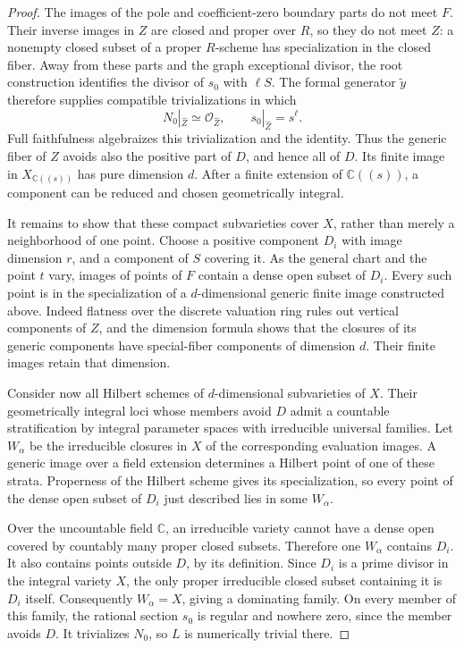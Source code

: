 \documentclass[11pt,letterpaper]{article}
\theoremstyle{definition}
\theoremstyle{remark}
\begin{document}
\begin{proof}
The images of the pole and coefficient-zero boundary
parts do not meet $F$.  Their inverse images in $Z$ are
closed and proper over $R$, so they do not meet $Z$:
a nonempty closed subset of a proper $R$-scheme has
specialization in the closed fiber.  Away from these parts
and the graph exceptional divisor, the root construction
identifies the divisor of $s_0$ with $\ell S$.
The formal generator $\widetilde y$ therefore supplies
compatible trivializations in which
\[
 N_0|_{\widehat Z}\simeq\mathcal{O}_{\widehat Z},
 \qquad s_0|_{\widehat Z}=s^\ell.
\]
Full faithfulness algebraizes this trivialization and the
identity.  Thus the generic fiber of $Z$ avoids also the
positive part of $D$, and hence all of $D$.
Its finite image in $X_{\mathbb{C}((s))}$ has pure dimension $d$.
After a finite extension of $\mathbb{C}((s))$, a component can be
reduced and chosen geometrically integral.

It remains to show that these compact subvarieties cover
$X$, rather than merely a neighborhood of one point.
Choose a positive component $D_i$ with image dimension
$r$, and a component of $S$ covering it.  As the general
chart and the point $t$ vary, images of points of $F$
contain a dense open subset of $D_i$.
Every such point is in the specialization of a
$d$-dimensional generic finite image constructed above.
Indeed flatness over the discrete valuation ring rules
out vertical components of $Z$, and the dimension
formula shows that the closures of its generic
components have special-fiber components of dimension
$d$.  Their finite images retain that dimension.

Consider now all Hilbert schemes of $d$-dimensional
subvarieties of $X$.  Their geometrically integral loci
whose members avoid $D$ admit a countable stratification
by integral parameter spaces with irreducible universal
families.  Let $W_\alpha$ be the irreducible closures in
$X$ of the corresponding evaluation images.  A generic
image over a field extension determines a Hilbert point
of one of these strata.  Properness of the Hilbert scheme
gives its specialization, so every point of the dense
open subset of $D_i$ just described lies in some
$W_\alpha$.

Over the uncountable field $\mathbb{C}$, an irreducible variety
cannot have a dense open covered by countably many proper
closed subsets.  Therefore one $W_\alpha$ contains
$D_i$.  It also contains points outside $D$, by its
definition.  Since $D_i$ is a prime divisor in the
integral variety $X$, the only proper irreducible closed
subset containing it is $D_i$ itself.  Consequently
$W_\alpha=X$, giving a dominating family.
On every member of this family, the rational section
$s_0$ is regular and nowhere zero, since the member
avoids $D$.  It trivializes $N_0$, so $L$ is numerically
trivial there.
\end{proof}
\end{document}
